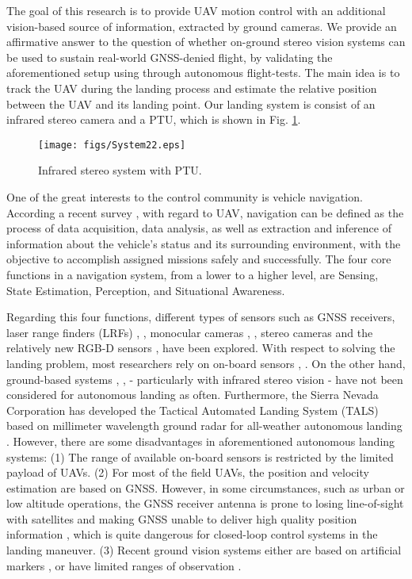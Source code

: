 \documentclass[letterpaper, 10 pt, conference]{ieeeconf}  %
\begin{document}
The goal of this research is to provide UAV motion control with an additional vision-based source of information, extracted by ground cameras. We provide an affirmative answer to the question of whether on-ground stereo vision systems can be used to sustain real-world GNSS-denied flight, by validating the aforementioned setup using through autonomous flight-tests. The main idea is to track the UAV during the landing process and estimate the relative position between the UAV and its landing point. Our landing system is consist of an infrared stereo camera and a PTU, which is shown in Fig. \ref{fig:system2}.
   \begin{figure}[!tb]
      \centering
      \texttt{[image: figs/System22.eps]}
      \caption{Infrared stereo system with PTU.}
      \label{fig:system2}
   \end{figure}

One of the great interests to the control community is vehicle navigation. According a recent survey \cite{Kendoul2012}, with regard to UAV, navigation can be defined as the process of data acquisition, data analysis, as well as extraction and inference of information about the vehicle's status and its surrounding environment, with the objective to accomplish assigned missions safely and successfully. The four core functions in a navigation system, from a lower to a higher level, are Sensing, State Estimation, Perception, and Situational Awareness.

Regarding this four functions, different types of sensors such as GNSS receivers, laser range finders (LRFs) \cite{Wu2013}, \cite{Vasconcelos2010}, monocular cameras \cite{Wu2010}, \cite{Weiss2011}, stereo cameras and the relatively new  RGB-D sensors \cite{Lange2012}, \cite{Bachrach2012} have been explored. With respect to solving the landing problem, most researchers rely on on-board sensors \cite{Wu2010}, \cite{Templeton2007}. On the other hand, ground-based systems \cite{PEBRIANTI2010}, \cite{Abbeel2010}, \cite{Wang2006} - particularly with infrared stereo vision - have not been considered for autonomous landing as often. Furthermore, the Sierra Nevada Corporation has developed the Tactical Automated Landing System (TALS) based on millimeter wavelength ground radar for all-weather autonomous landing  \cite{TALS}. However, there are some disadvantages in aforementioned autonomous 
landing systems: (1) The range of available on-board sensors is restricted by the limited payload of UAVs. (2) For most of the field UAVs, the position and velocity estimation are based on GNSS. However, in some circumstances, such as urban or low altitude operations, the GNSS receiver antenna is prone to losing line-of-sight with satellites and making GNSS unable to deliver high quality position information  \cite{RePEc:cdl:itsrrp:qt5tn6b3cp}, which is quite dangerous for closed-loop control systems in the landing maneuver. (3) Recent ground vision systems either are based on artificial markers \cite{Martnez2011a},  \cite{Martinez2009} or have limited ranges of observation \cite{Wang2006}.
\end{document}
